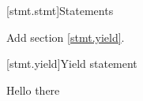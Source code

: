 
[stmt.stmt]{Statements}%

Add section \ref{stmt.yield}.

\setcounter{section}{8}
[stmt.yield]{Yield statement}%

Hello there
